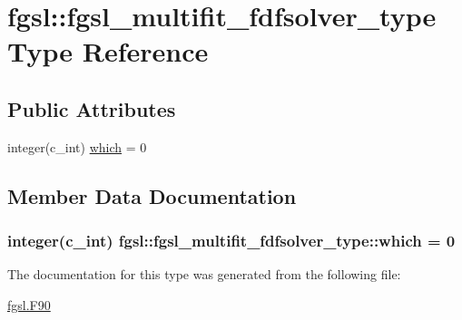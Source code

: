 \hypertarget{structfgsl_1_1fgsl__multifit__fdfsolver__type}{}\section{fgsl\+:\+:fgsl\+\_\+multifit\+\_\+fdfsolver\+\_\+type Type Reference}
\label{structfgsl_1_1fgsl__multifit__fdfsolver__type}
\subsection*{Public Attributes}
\begin{DoxyCompactItemize}
\item 
integer(c\+\_\+int) \hyperlink{structfgsl_1_1fgsl__multifit__fdfsolver__type_adba3a5bb930ece74f35ee9c9b9598518}{which} = 0
\end{DoxyCompactItemize}


\subsection{Member Data Documentation}
\hypertarget{structfgsl_1_1fgsl__multifit__fdfsolver__type_adba3a5bb930ece74f35ee9c9b9598518}{}
\subsubsection[{which}]{\setlength{\rightskip}{0pt plus 5cm}integer(c\+\_\+int) fgsl\+::fgsl\+\_\+multifit\+\_\+fdfsolver\+\_\+type\+::which = 0}\label{structfgsl_1_1fgsl__multifit__fdfsolver__type_adba3a5bb930ece74f35ee9c9b9598518}


The documentation for this type was generated from the following file\+:\begin{DoxyCompactItemize}
\item 
\hyperlink{fgsl_8F90}{fgsl.\+F90}\end{DoxyCompactItemize}
